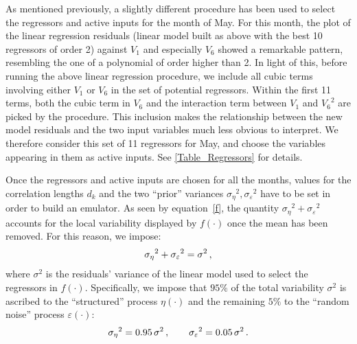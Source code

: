 \documentclass[a4paper, 12pt]{article}
\newcommand{\eps}{\varepsilon}
\begin{document}
As mentioned previously, a slightly different procedure has been used to select the regressors and active inputs for the month of May. For this month, the plot of the linear regression residuals (linear model built as above with the best 10 regressors of order 2) against $V_1$ and especially $V_6$ showed a remarkable pattern, resembling the one of a polynomial of order higher than 2.
In light of this, before running the above linear regression procedure, we include all cubic terms involving either $V_1$ or $V_6$ 
in the set of potential regressors. Within the first 11 terms, both the cubic term in $V_6$ and the interaction term between $V_1$ and ${V_6}^2$ are picked by the procedure. This inclusion makes the relationship between the new model residuals and the two input variables much less obvious to interpret. We therefore consider this set of 11 regressors for May, and choose the variables appearing in them as active inputs. See \autoref{Table_Regressors} for details.



Once the regressors and active inputs are chosen for all the months, values for the correlation lengths $d_k$ and the two ``prior'' variances ${\sigma_\eta}^2, {\sigma_\eps}^2$ have to be set in order to build an emulator. 
As seen by equation~\eqref{f}, the quantity $ {\sigma_\eta}^2 + {\sigma_\eps}^2$ accounts for the local variability displayed by $f(\cdot)$ once the mean has been removed. For this reason, we impose:
\begin{equation}
 {\sigma_\eta}^2 + {\sigma_\eps}^2 = \sigma^2\,, \vspace{1.5ex}
\end{equation}
where $\sigma^2$ is the residuals' variance of the linear model used to select the regressors in $f(\cdot)$. Specifically, we impose that $95\%$ of the total variability $\sigma^2$ is ascribed to the ``structured'' process $\eta(\cdot)$ and the remaining $5\%$ to the ``random  noise'' process $\eps(\cdot)$:\vspace{0.7ex}
\begin{equation}
 {\sigma_\eta}^2 = 0.95 \,\sigma^2\,, \qquad {\sigma_\eps}^2 = 0.05 \,\sigma^2\,.\vspace{0.5ex}
\end{equation}
\end{document}
